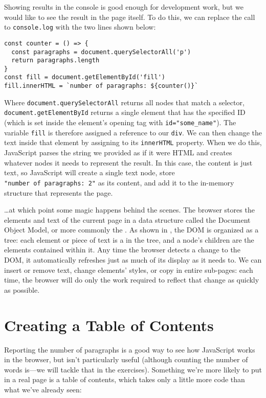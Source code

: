 Showing results in the console is good enough for development work,
but we would like to see the result in the page itself.
To do this,
we can replace the call to \texttt{console.log} with the two lines shown below:

\begin{verbatim}
const counter = () => {
  const paragraphs = document.querySelectorAll('p')
  return paragraphs.length
}
const fill = document.getElementById('fill')
fill.innerHTML = `number of paragraphs: ${counter()}`
\end{verbatim}

Where \texttt{document.querySelectorAll} returns all nodes that match a selector,
\texttt{document.getElementById} returns a single element that has the specified ID
(which is set inside the element's opening tag with \texttt{id="some\_name"}).
The variable \texttt{fill} is therefore assigned a reference to our \texttt{div}.
We can then change the text inside that element by assigning to
its \texttt{innerHTML} property.
When we do this,
JavaScript parses the string we provided as if it were HTML
and creates whatever nodes it needs to represent the result.
In this case,
the content is just text,
so JavaScript will create a single text node,
store \texttt{"number\ of\ paragraphs:\ 2"} as its content,
and add it to the in-memory structure that represents the page.

{\ldots}at which point some magic happens behind the scenes.
The browser stores the elements and text of the current page in a data structure called
the Document Object Model,
or more commonly the .
As shown in ,
the DOM is organized as a tree:
each element or piece of text is a  in the tree,
and a node's children are the elements contained within it.
Any time the browser detects a change to the DOM,
it automatically refreshes just as much of its display as it needs to.
We can insert or remove text,
change elements' styles,
or copy in entire sub-pages:
each time,
the browser will do only the work required to reflect that change
as quickly as possible.

\section{Creating a Table of Contents}\label{s:pages-toc}

Reporting the number of paragraphs is a good way to see how JavaScript works in the browser,
but isn't particularly useful
(although counting the number of words is---we will tackle that in the exercises).
Something we're more likely to put in a real page is a table of contents,
which takes only a little more code than what we've already seen:

